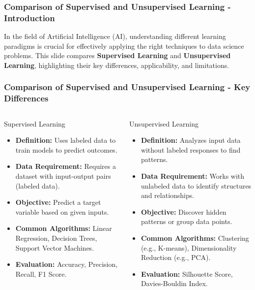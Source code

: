 \documentclass{beamer}
\begin{document}
\begin{frame}[fragile]
    \frametitle{Comparison of Supervised and Unsupervised Learning - Introduction}
    In the field of Artificial Intelligence (AI), understanding different learning paradigms is crucial for effectively 
    applying the right techniques to data science problems. This slide compares \textbf{Supervised Learning} and 
    \textbf{Unsupervised Learning}, highlighting their key differences, applicability, and limitations.
\end{frame}

\begin{frame}[fragile]
    \frametitle{Comparison of Supervised and Unsupervised Learning - Key Differences}
    \begin{columns}
        \begin{column}{0.5\textwidth}
            \begin{block}{Supervised Learning}
                \begin{itemize}
                    \item \textbf{Definition:} Uses labeled data to train models to predict outcomes.
                    \item \textbf{Data Requirement:} Requires a dataset with input-output pairs (labeled data).
                    \item \textbf{Objective:} Predict a target variable based on given inputs.
                    \item \textbf{Common Algorithms:} Linear Regression, Decision Trees, Support Vector Machines.
                    \item \textbf{Evaluation:} Accuracy, Precision, Recall, F1 Score.
                \end{itemize}
            \end{block}
        \end{column}
        
        \begin{column}{0.5\textwidth}
            \begin{block}{Unsupervised Learning}
                \begin{itemize}
                    \item \textbf{Definition:} Analyzes input data without labeled responses to find patterns.
                    \item \textbf{Data Requirement:} Works with unlabeled data to identify structures and relationships.
                    \item \textbf{Objective:} Discover hidden patterns or group data points.
                    \item \textbf{Common Algorithms:} Clustering (e.g., K-means), Dimensionality Reduction (e.g., PCA).
                    \item \textbf{Evaluation:} Silhouette Score, Davies-Bouldin Index.
                \end{itemize}
            \end{block}
        \end{column}
    \end{columns}
\end{frame}
\end{document}
